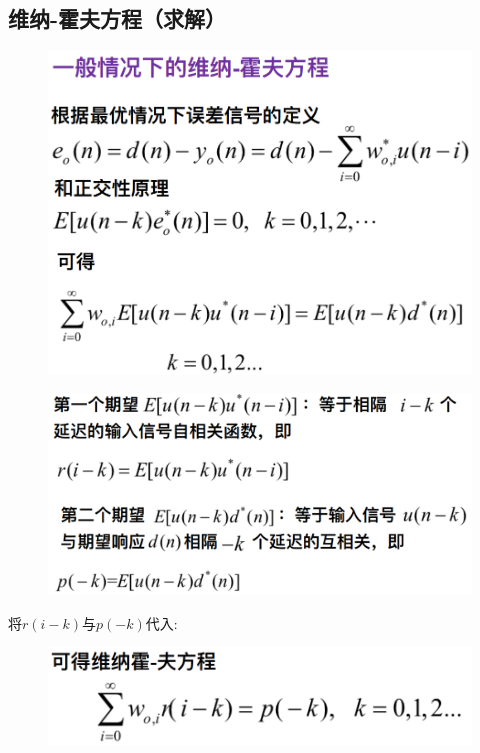 \documentclass[UTF8]{ctexart} %
\begin{document}
		\subsection{维纳-霍夫方程（求解）}	
			\begin{figure}[H]
				\centering\includegraphics[scale=0.3]{12.png}
			\end{figure}
			\begin{figure}[H]
				\centering\includegraphics[scale=0.3]{13.png}
			\end{figure}
			
			将$r(i-k)$与$p(-k)$代入:

			\begin{figure}[H]
				\centering\includegraphics[scale=0.3]{15.png}
			\end{figure}
		
\end{document}
